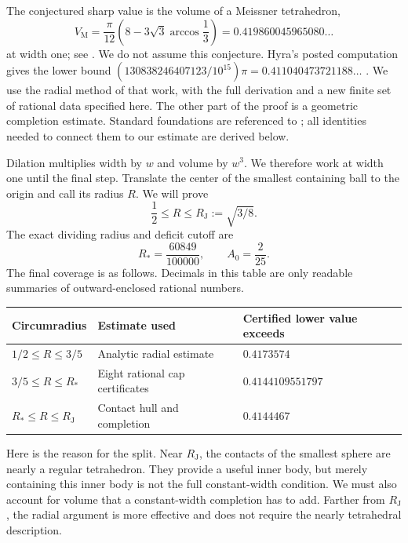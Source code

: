 \documentclass[11pt]{article}
\numberwithin{equation}{section}
\theoremstyle{definition}\newtheorem{definition}[theorem]{Definition}
\theoremstyle{remark}\newtheorem{remark}[theorem]{Remark}
\newcommand{\RJ}{R_{\mathrm J}}
\newcommand{\RS}{R_*}
\newcommand{\VM}{V_{\mathrm M}}
\begin{document}
The conjectured sharp value is the volume of a Meissner tetrahedron,
\begin{equation}\label{eq:Meissner}
 \VM=\frac{\pi}{12}\left(8-3\sqrt3\arccos\frac13\right)
       =0.419860045965080\ldots
\end{equation}
at width one; see \cite{HyndVolume,Bogosel}. We do not assume this conjecture.
Hyra's posted computation gives the lower bound
$(130838246407123/10^{15})\pi=0.411040473721188\ldots$ \cite{Hyra}.
We use the radial method of that work, with the full derivation and a new
finite set of rational data specified here. The other part of the proof is
a geometric completion estimate. Standard foundations are referenced to
\cite{Schneider}; all identities needed to connect them to our estimate are
derived below.

Dilation multiplies width by $w$ and volume by $w^3$. We therefore work at
width one until the final step. Translate the center of the smallest
containing ball to the origin and call its radius $R$. We will prove
\[
 \frac12\le R\le\RJ:=\sqrt{3/8}.
\]
The exact dividing radius and deficit cutoff are
\begin{equation}\label{eq:cutoffs}
 \RS=\frac{60849}{100000},\qquad A_0=\frac2{25}.
\end{equation}
The final coverage is as follows. Decimals in this table are only readable
summaries of outward-enclosed rational numbers.
\begin{center}
\begin{tabular}{@{}lll@{}}
\toprule
Circumradius & Estimate used & Certified lower value exceeds\\
\midrule
$1/2\le R\le3/5$ & Analytic radial estimate & $0.4173574$\\
$3/5\le R\le\RS$ & Eight rational cap certificates & $0.4144109551797$\\
$\RS\le R\le\RJ$ & Contact hull and completion & $0.4144467$\\
\bottomrule
\end{tabular}
\end{center}

Here is the reason for the split. Near $\RJ$, the contacts of the smallest
sphere are nearly a regular tetrahedron. They provide a useful inner body,
but merely containing this inner body is not the full constant-width
condition. We must also account for volume that a constant-width completion
has to add. Farther from $\RJ$, the radial argument is more effective and
does not require the nearly tetrahedral description.
\end{document}
